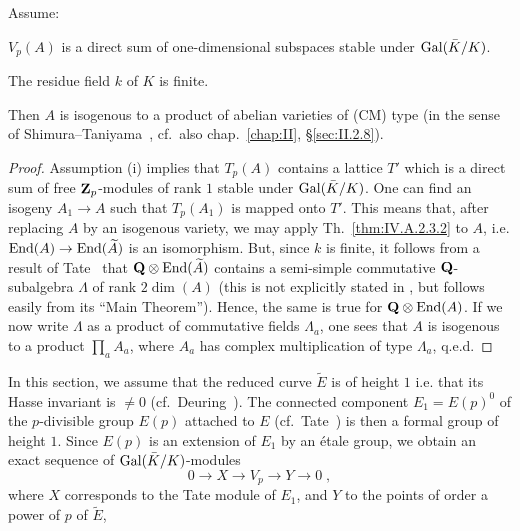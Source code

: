 \begin{corollary}
Assume:
\begin{rlist}
\item $V_p(A)$ is a direct sum of one-dimensional subspaces stable under
$\mathrm{Gal}(\bar K/K)$.
\item The residue field $k$ of $K$ is finite.
\end{rlist}
Then $A$ is isogenous to a product of abelian varieties of (CM) type
(in the sense of Shimura--Taniyama~\cite{shimura-taniyama},
cf.~also chap.~\ref{chap:II}, \S\ref{sec:II.2.8}).
\end{corollary}

\begin{proof}
Assumption (i) implies that $T_p(A)$ contains a lattice $T'$ which is a
direct sum of free $\mathbf{Z}_p$-modules of rank $1$ stable under
$\mathrm{Gal}(\bar K/K)$. One can find an isogeny $A_1\to A$ such that
$T_p(A_1)$ is mapped onto $T'$. This means that, after replacing $A$ by
an isogenous variety, we may apply Th.~\ref{thm:IV.A.2.3.2} to $A$,
i.e. $\mathrm{End}(A)\to\mathrm{End}(\widetilde{A})$ is an isomorphism.
But, since $k$ is finite, it follows from a result of
Tate~\cite{tate-endo} that $\mathbf{Q}\mathbin{\otimes}\mathrm{End}(\widetilde{A})$ contains a
semi-simple commutative $\mathbf{Q}$-subalgebra $\Lambda$ of rank $2\dim(A)$
(this is not explicitly stated in \cite{tate-endo}, but follows easily
from its ``Main Theorem''). Hence, the same is true for
$\mathbf{Q}\mathbin{\otimes}\mathrm{End}(A)$. If we now write $\Lambda$ as a product of
commutative fields $\Lambda_a$, one sees that $A$ is isogenous to a
product $\prod_a A_a$, where $A_a$ has complex multiplication of type
$\Lambda_a$, q.e.d.
\end{proof}


In this section, we assume that the reduced curve $\widetilde{E}$ is of
height $1$ i.e. that its Hasse invariant is $\neq 0$
(cf.~Deuring~\cite{deuring}). The connected component
$E_1=E(p)^0$ of the $p$-divisible group $E(p)$ attached to $E$
(cf.~Tate~\cite{tate-pdiv}) is then a formal group of height $1$. Since
$E(p)$ is an extension of $E_1$ by an \'etale group, we obtain an exact
sequence of $\mathrm{Gal}(\bar K/K)$-modules
\begin{equation}
\tag{$*$}\label{eq:IV.A.2.4.star}
0 \longrightarrow X \longrightarrow V_p \longrightarrow Y
   \longrightarrow 0\;,
\end{equation}
where $X$ corresponds to the Tate module of $E_1$, and $Y$ to the points
of order a power of $p$ of $\widetilde{E}$,

